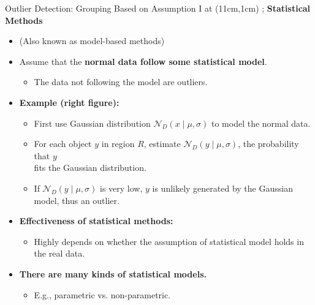 \begin{frame}{Outlier Detection: Grouping Based on Assumption I}
	\tikzoverlay at (11cm,1cm) {};
	\textcolor{faugray}{\textbf{Statistical Methods}}
	\begin{itemize}
		\item (Also known as model-based methods)
		\item Assume that the \textbf{\color{airforceblue}normal data follow some statistical model}.
		      \begin{itemize}
			      \item The data not following the model are outliers.
		      \end{itemize}
		\item \textbf{Example (right figure):}
		      \begin{itemize}
			      \item First use Gaussian distribution $\mathcal{N}_D(x \; \vert \; \mu,\sigma)$ to model the normal data.
			      \item For each object $y$ in region $R$, estimate $\mathcal{N}_D(y \; \vert \; \mu, \sigma)$, the probability that $y$ \\
			            fits the Gaussian distribution.
			      \item If $\mathcal{N}_D(y \; \vert \; \mu, \sigma)$ is very low, $y$ is unlikely generated by the Gaussian model, thus an outlier.
		      \end{itemize}
		      \item\textbf{Effectiveness of statistical methods:}
		      \begin{itemize}
			      \item Highly depends on whether the assumption of statistical model holds in the real data.
		      \end{itemize}
		\item \textbf{There are many kinds of statistical models.}
		      \begin{itemize}
			      \item E.g., parametric vs. non-parametric.
		      \end{itemize}
	\end{itemize}
\end{frame}


